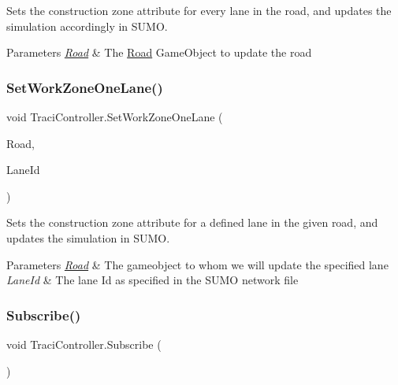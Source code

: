 Sets the construction zone attribute for every lane in the road, and updates the simulation accordingly in S\+U\+MO. 


\begin{DoxyParams}{Parameters}
{\em \mbox{\hyperlink{struct_road}{Road}}} & The \mbox{\hyperlink{struct_road}{Road}} Game\+Object to update the road\\
\hline
\end{DoxyParams}
\mbox{\label{class_traci_controller_a0a9b38a43070487d3a2578d36e5d105a}} 
\subsubsection{\texorpdfstring{SetWorkZoneOneLane()}{SetWorkZoneOneLane()}}
{\footnotesize\ttfamily void Traci\+Controller.\+Set\+Work\+Zone\+One\+Lane (\begin{DoxyParamCaption}\item[{Game\+Object}]{Road,  }\item[{String}]{Lane\+Id }\end{DoxyParamCaption})}



Sets the construction zone attribute for a defined lane in the given road, and updates the simulation in S\+U\+MO. 


\begin{DoxyParams}{Parameters}
{\em \mbox{\hyperlink{struct_road}{Road}}} & The gameobject to whom we will update the specified lane\\
\hline
{\em Lane\+Id} & The lane Id as specified in the S\+U\+MO network file\\
\hline
\end{DoxyParams}
\mbox{\label{class_traci_controller_aacc5a9530481fe986ee9329f07e4eccd}} 
\subsubsection{\texorpdfstring{Subscribe()}{Subscribe()}}
{\footnotesize\ttfamily void Traci\+Controller.\+Subscribe (\begin{DoxyParamCaption}{ }\end{DoxyParamCaption})}



